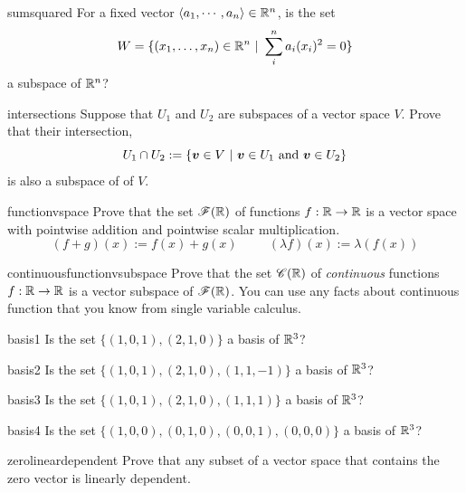 \begin{problem}{sumsquared}
    For a fixed vector $\langle a_1, \cdots, a_n \rangle \in \mathbb{R}^n$, is the set $$W = \{(x_1, \dots, x_n) \in \mathbb{R}^n \ | \ \sum^n_i a_i(x_i)^2 = 0 \}$$ a subspace of $\mathbb{R}^n$?
\end{problem}

\begin{problem}{intersections}
    Suppose that $U_1$ and $U_2$ are subspaces of a vector space $V$.  Prove that their intersection, $$U_1 \cap U_2 := \{\bm{v} \in V \ | \ \bm{v} \in U_1 \textnormal{ and } \bm{v} \in U_2\}$$ is also a subspace of of $V$.
\end{problem}

\begin{problem}{functionvspace}
    Prove that the set $\mathscr{F}(\mathbb{R})$ of functions $f : \mathbb{R} \to \mathbb{R}$ is a vector space with pointwise addition and pointwise scalar multiplication.  $$(f + g)(x) := f(x) + g(x) \ \qquad \ (\lambda f)(x) := \lambda (f(x))$$
\end{problem}

\begin{problem}{continuousfunctionvsubspace}
    Prove that the set $\mathscr{C}(\mathbb{R})$ of \textit{continuous }functions $f : \mathbb{R} \to \mathbb{R}$ is a vector subspace of $\mathscr{F}(\mathbb{R})$.  You can use any facts about continuous function that you know from single variable calculus.
\end{problem}


\begin{problem}{basis1}
Is the set $\{(1,0,1), (2,1,0) \}$ a basis of $\mathbb{R}^3$?
\end{problem}

\begin{problem}{basis2}
Is the set $\{(1,0,1), (2,1,0), (1,1,-1) \}$ a basis of $\mathbb{R}^3$?
\end{problem}

\begin{problem}{basis3}
Is the set $\{(1,0,1), (2,1,0), (1,1,1) \}$ a basis of $\mathbb{R}^3$?
\end{problem}

\begin{problem}{basis4}
Is the set $\{(1,0,0), (0,1,0), (0,0,1), (0,0,0) \}$ a basis of $\mathbb{R}^3$?
\end{problem}

\begin{problem}{zerolineardependent}
Prove that any subset of a vector space that contains the zero vector is linearly
dependent.
\end{problem}


